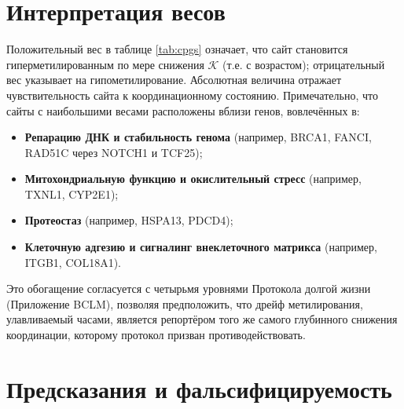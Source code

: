 \documentclass[12pt,a4paper]{article}
\newcommand{\REL}{\mathcal{K}}          %
\begin{document}
	\section{Интерпретация весов}
	\label{sec:weights}
	Положительный вес в таблице \ref{tab:cpgs} означает, что сайт становится гиперметилированным по мере снижения \(\REL\) (т.е. с возрастом); отрицательный вес указывает на гипометилирование. Абсолютная величина отражает чувствительность сайта к координационному состоянию. Примечательно, что сайты с наибольшими весами расположены вблизи генов, вовлечённых в:
	\begin{itemize}
		\item \textbf{Репарацию ДНК и стабильность генома} (например, BRCA1, FANCI, RAD51C через NOTCH1 и TCF25);
		\item \textbf{Митохондриальную функцию и окислительный стресс} (например, TXNL1, CYP2E1);
		\item \textbf{Протеостаз} (например, HSPA13, PDCD4);
		\item \textbf{Клеточную адгезию и сигналинг внеклеточного матрикса} (например, ITGB1, COL18A1).
	\end{itemize}
	Это обогащение согласуется с четырьмя уровнями Протокола долгой жизни (Приложение BCLM), позволяя предположить, что дрейф метилирования, улавливаемый часами, является репортёром того же самого глубинного снижения координации, которому протокол призван противодействовать.
	
	\section{Предсказания и фальсифицируемость}
	\label{sec:predictions}
	
\end{document}
